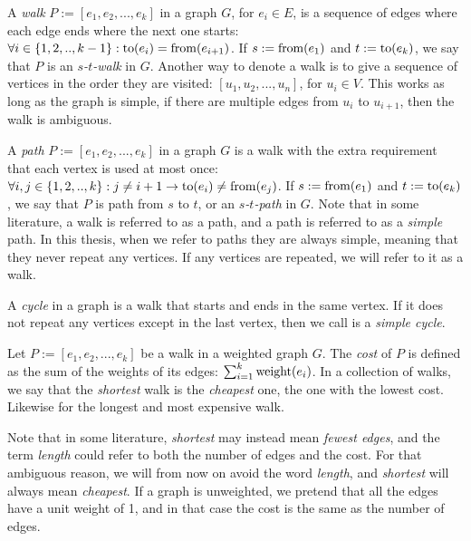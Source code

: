 \begin{definition}[Walk]
    A \emph{walk} $P := [e_1, e_2, ..., e_k]$ in a graph $G$, for $e_i \in E$, is a sequence of edges where each edge ends where the next one starts: $\forall i \in \{1,2,..,k-1\} : \operatorname{to}(e_i) = \operatorname{from}(e_{i+1})$.
    If $s := \operatorname{from}(e_1)$ and $t := \operatorname{to}(e_k)$, we say that $P$ is an \emph{$s$-$t$-walk} in $G$.
    Another way to denote a walk is to give a sequence of vertices in the order they are visited: $[u_1, u_2, ..., u_n]$, for $u_i \in V$. This works as long as the graph is simple, if there are multiple edges from $u_i$ to $u_{i+1}$, then the walk is ambiguous.
\end{definition}

\begin{definition}[Path]
    A \emph{path} $P := [e_1, e_2, ..., e_k]$ in a graph $G$ is a walk with the extra requirement that each vertex is used at most once: $\forall i, j \in \{1,2,..,k\} : j \neq {i+1} \rightarrow \operatorname{to}(e_i) \neq \operatorname{from}(e_j)$.
    If $s := \operatorname{from}(e_1)$ and $t := \operatorname{to}(e_k)$, we say that $P$ is path from $s$ to $t$, or an \emph{$s$-$t$-path} in $G$.
    Note that in some literature, a walk is referred to as a path, and a path is referred to as a \emph{simple} path. In this thesis, when we refer to paths they are always simple, meaning that they never repeat any vertices. If any vertices are repeated, we will refer to it as a walk.    
\end{definition}

\begin{definition}[Cycle]
    A \emph{cycle} in a graph is a walk that starts and ends in the same vertex. If it does not repeat any vertices except in the last vertex, then we call is a \emph{simple cycle}.
\end{definition}

\begin{definition}
    Let $P := [e_1, e_2, ..., e_k]$ be a walk in a weighted graph $G$. The \emph{cost} of $P$ is defined as the sum of the weights of its edges: $\sum_{i=1}^k \operatorname{weight}(e_i)$. In a collection of walks, we say that the \emph{shortest} walk is the \emph{cheapest} one, the one with the lowest cost. Likewise for the longest and most expensive walk. 

    Note that in some literature, \emph{shortest} may instead mean \emph{fewest edges}, and the term \emph{length} could refer to both the number of edges and the cost. For that ambiguous reason, we will from now on avoid the word \emph{length}, and \emph{shortest} will always mean \emph{cheapest}. If a graph is unweighted, we pretend that all the edges have a unit weight of 1, and in that case the cost is the same as the number of edges.
\end{definition}

